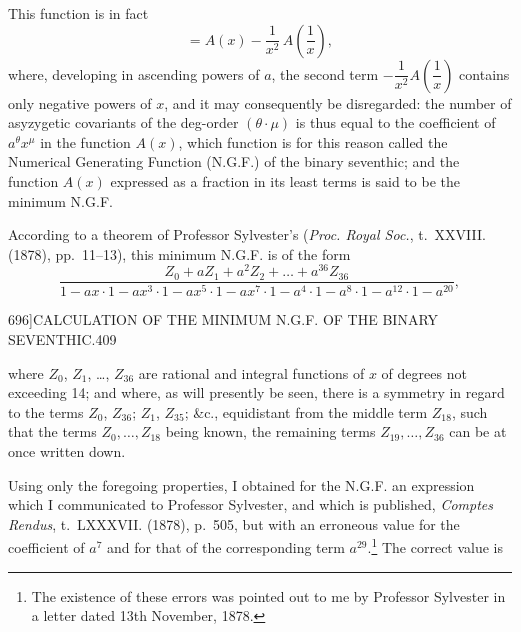 \documentclass[11pt]{article}
\begin{document}
This function is in fact
\[ = A(x) - \frac{1}{x^{2}}\,A\!\left(\frac{1}{x}\right), \]
where, developing in ascending powers of $a$, the second term $-\dfrac{1}{x^{2}} A\!\left(\dfrac{1}{x}\right)$ contains only negative powers of $x$, and it may consequently be disregarded: the number of asyzygetic covariants of the deg-order $(\theta\cdot\mu)$ is thus equal to the coefficient of $a^{\theta} x^{\mu}$ in the function $A(x)$, which function is for this reason called the Numerical Generating Function (N.G.F.) of the binary seventhic; and the function $A(x)$ expressed as a fraction in its least terms is said to be the minimum N.G.F.

According to a theorem of Professor Sylvester's (\textit{Proc. Royal Soc.}, t.~XXVIII. (1878), pp.~11--13), this minimum N.G.F. is of the form
\[ \frac{Z_{0} + a Z_{1} + a^{2} Z_{2} + \dots + a^{36} Z_{36}}{1-ax\cdot 1-ax^{3}\cdot 1-ax^{5}\cdot 1-ax^{7}\cdot 1-a^{4}\cdot 1-a^{8}\cdot 1-a^{12}\cdot 1-a^{20}}, \]

\clearpage
\begin{center}\small 696]\hfill CALCULATION OF THE MINIMUM N.G.F. OF THE BINARY SEVENTHIC.\hfill 409\end{center}

where $Z_{0}$, $Z_{1}$, \dots, $Z_{36}$ are rational and integral functions of $x$ of degrees not exceeding 14; and where, as will presently be seen, there is a symmetry in regard to the terms $Z_{0}$, $Z_{36}$; $Z_{1}$, $Z_{35}$; \&c., equidistant from the middle term $Z_{18}$, such that the terms $Z_{0}, \dots, Z_{18}$ being known, the remaining terms $Z_{19}, \dots, Z_{36}$ can be at once written down.

Using only the foregoing properties, I obtained for the N.G.F. an expression which I communicated to Professor Sylvester, and which is published, \textit{Comptes Rendus}, t.~LXXXVII. (1878), p.~505, but with an erroneous value for the coefficient of $a^{7}$ and for that of the corresponding term $a^{29}$.\footnote{The existence of these errors was pointed out to me by Professor Sylvester in a letter dated 13th November, 1878.} The correct value is
\end{document}
